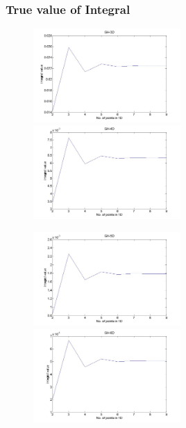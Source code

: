 \documentclass[11pt]{beamer}
\begin{document}
\begin{frame}
\frametitle{True value of Integral}
   \begin{figure}[thpb]
      \centering
      \includegraphics[width=0.5\textwidth]{3dGH_for_gauss_sqr.jpg}
      \includegraphics[width=0.5\textwidth]{4dGH_for_gauss_sqr.jpg}
      \label{fig:23d4m1}
   \end{figure} 

   \begin{figure}[thpb]
      \centering
      \includegraphics[width=0.5\textwidth]{5dGH_for_gauss_sqr.jpg}
      \includegraphics[width=0.5\textwidth]{6dGH_for_gauss_sqr.jpg}
   \end{figure} 
\end{frame}
\end{document}
